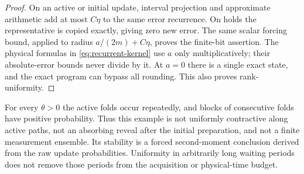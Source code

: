 \begin{proof}
On an active or initial update, interval projection and approximate arithmetic add at most $C\eta$ to the same error recurrence. On holds the representative is copied exactly, giving zero new error. The same scalar forcing bound, applied to radius $a/(2m)+C\eta$, proves the finite-bit assertion. The physical formulas in \eqref{eq:recurrent-kernel} use $a$ only multiplicatively; their absolute-error bounds never divide by it. At $a=0$ there is a single exact state, and the exact program can bypass all rounding. This also proves rank-uniformity.
\end{proof}

For every $\theta>0$ the active folds occur repeatedly, and blocks of consecutive folds have positive probability. Thus this example is not uniformly contractive along active paths, not an absorbing reveal after the initial preparation, and not a finite measurement ensemble. Its stability is a forced second-moment conclusion derived from the raw update probabilities. Uniformity in arbitrarily long waiting periods does not remove those periods from the acquisition or physical-time budget.
